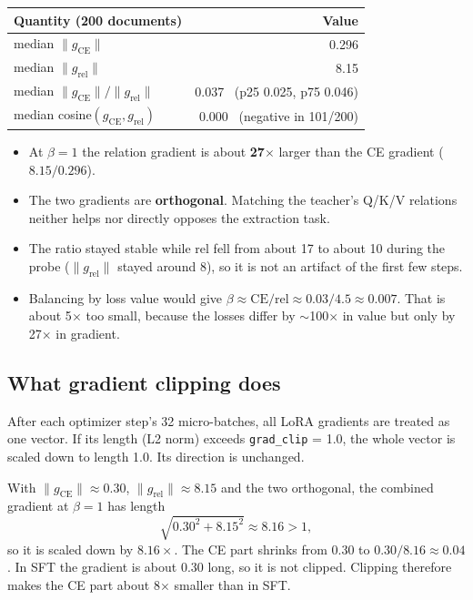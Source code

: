 \documentclass[10pt]{article}
\newcommand{\code}[1]{\texttt{#1}}
\begin{document}
\begin{center}
\begin{tabular}{lr}
\toprule
Quantity (200 documents) & Value \\
\midrule
median $\lVert g_{\mathrm{CE}} \rVert$ & 0.296 \\
median $\lVert g_{\mathrm{rel}} \rVert$ & 8.15 \\
median $\lVert g_{\mathrm{CE}} \rVert / \lVert g_{\mathrm{rel}} \rVert$ & 0.037 \ (p25 0.025, p75 0.046) \\
median cosine$(g_{\mathrm{CE}}, g_{\mathrm{rel}})$ & 0.000 \ (negative in 101/200) \\
\bottomrule
\end{tabular}
\end{center}

\begin{itemize}
  \item At $\beta = 1$ the relation gradient is about \textbf{27$\times$} larger than the CE gradient ($8.15 / 0.296$).
  \item The two gradients are \textbf{orthogonal}. Matching the teacher's Q/K/V relations neither helps nor directly opposes the extraction task.
  \item The ratio stayed stable while rel fell from about 17 to about 10 during the probe ($\lVert g_{\mathrm{rel}} \rVert$ stayed around 8), so it is not an artifact of the first few steps.
  \item Balancing by loss value would give $\beta \approx \mathrm{CE}/\mathrm{rel} \approx 0.03/4.5 \approx 0.007$. That is about 5$\times$ too small, because the losses differ by $\sim$100$\times$ in value but only by 27$\times$ in gradient.
\end{itemize}

\subsection*{What gradient clipping does}

After each optimizer step's 32 micro-batches, all LoRA gradients are treated as one vector. If its length (L2 norm) exceeds \code{grad\_clip} = 1.0, the whole vector is scaled down to length 1.0. Its direction is unchanged.

With $\lVert g_{\mathrm{CE}} \rVert \approx 0.30$, $\lVert g_{\mathrm{rel}} \rVert \approx 8.15$ and the two orthogonal, the combined gradient at $\beta = 1$ has length
\[
  \sqrt{0.30^2 + 8.15^2} \approx 8.16 > 1,
\]
so it is scaled down by $8.16\times$. The CE part shrinks from 0.30 to $0.30 / 8.16 \approx 0.04$. In SFT the gradient is about 0.30 long, so it is not clipped. Clipping therefore makes the CE part about 8$\times$ smaller than in SFT.
\end{document}
